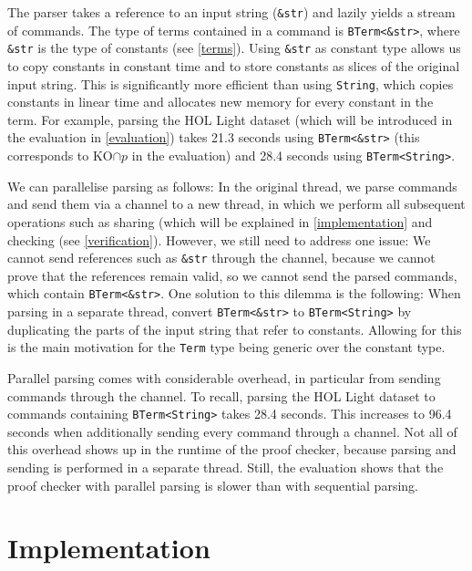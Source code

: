 \documentclass[screen,sigplan,10pt]{acmart}
\begin{document}
The parser takes a reference to an input string (\texttt{\&str}) and
lazily yields a stream of commands. The type of terms contained in a
command is \texttt{BTerm\textless{}\&str\textgreater{}}, where
\texttt{\&str} is the type of constants (see \autoref{terms}). Using
\texttt{\&str} as constant type allows us to copy constants in constant
time and to store constants as slices of the original input string. This
is significantly more efficient than using \texttt{String}, which copies
constants in linear time and allocates new memory for every constant in
the term. For example, parsing the HOL Light dataset (which will be
introduced in the evaluation in \autoref{evaluation}) takes 21.3 seconds
using \texttt{BTerm\textless{}\&str\textgreater{}} (this corresponds to
KO\({\cap p}\) in the evaluation) and 28.4 seconds using
\texttt{BTerm\textless{}String\textgreater{}}.

We can parallelise parsing as follows: In the original thread, we parse
commands and send them via a channel to a new thread, in which we
perform all subsequent operations such as sharing (which will be
explained in \autoref{implementation} and checking (see
\autoref{verification}). However, we still need to address one issue: We
cannot send references such as \texttt{\&str} through the channel,
because we cannot prove that the references remain valid, so we cannot
send the parsed commands, which contain
\texttt{BTerm\textless{}\&str\textgreater{}}. One solution to this
dilemma is the following: When parsing in a separate thread, convert
\texttt{BTerm\textless{}\&str\textgreater{}} to
\texttt{BTerm\textless{}String\textgreater{}} by duplicating the parts
of the input string that refer to constants. Allowing for this is the
main motivation for the \texttt{Term} type being generic over the
constant type.

Parallel parsing comes with considerable overhead, in particular from
sending commands through the channel. To recall, parsing the HOL Light
dataset to commands containing
\texttt{BTerm\textless{}String\textgreater{}} takes 28.4 seconds. This
increases to 96.4 seconds when additionally sending every command
through a channel. Not all of this overhead shows up in the runtime of
the proof checker, because parsing and sending is performed in a
separate thread. Still, the evaluation shows that the proof checker with
parallel parsing is slower than with sequential parsing.

\hypertarget{implementation}{%
\section{Implementation}\label{implementation}}
\end{document}
